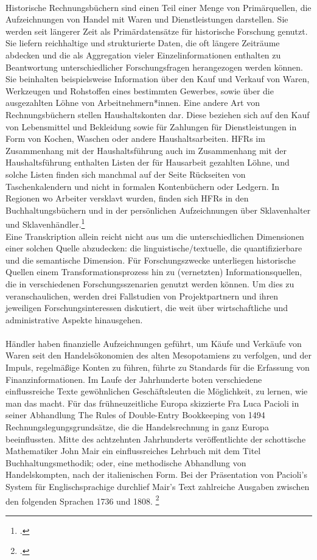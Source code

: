 \documentclass[12pt,a4paper]{article}
\begin{document}
\\
Historische Rechnungsbüchern sind einen Teil einer Menge von Primärquellen, die Aufzeichnungen von Handel mit Waren und Dienstleistungen darstellen. Sie werden seit längerer Zeit als Primärdatensätze für historische Forschung genutzt. Sie liefern reichhaltige und strukturierte Daten, die oft längere Zeiträume abdecken und die als Aggregation vieler Einzelinformationen enthalten zu Beantwortung unterschiedlicher Forschungsfragen herangezogen werden können. Sie beinhalten beispielsweise Information über den Kauf und Verkauf von Waren, Werkzeugen und Rohstoffen eines bestimmten Gewerbes, sowie über die ausgezahlten Löhne von Arbeitnehmern*innen. Eine andere Art von Rechnungsbüchern stellen Haushaltskonten dar. Diese beziehen sich auf den Kauf von Lebensmittel und Bekleidung sowie für Zahlungen für Dienstleistungen in Form von Kochen, Waschen oder andere Haushaltsarbeiten.   HFRs im Zusammenhang mit der Haushaltsführung auch im Zusammenhang mit der Haushaltsführung enthalten Listen der für Hausarbeit gezahlten Löhne, und solche Listen finden sich manchmal auf der Seite Rückseiten von Taschenkalendern und nicht in formalen Kontenbüchern oder Ledgern. In Regionen wo Arbeiter versklavt wurden, finden sich HFRs in den Buchhaltungsbüchern und in der persönlichen Aufzeichnungen über Sklavenhalter und Sklavenhändler.\footcite[][S.2]{tomasek2013encoding}
\\
Eine Transkription allein reicht nicht aus um die unterschiedlichen Dimensionen einer solchen Quelle abzudecken: die linguistische/textuelle, die quantifizierbare und die semantische Dimension. Für Forschungszwecke unterliegen historische Quellen einem Transformationsprozess hin zu (vernetzten) Informationsquellen, die in verschiedenen Forschungsszenarien genutzt werden können. Um dies zu veranschaulichen, werden drei Fallstudien von Projektpartnern und ihren jeweiligen Forschungsinteressen diskutiert, die weit über wirtschaftliche und administrative Aspekte hinausgehen.
\\
\\
Händler haben finanzielle Aufzeichnungen geführt, um Käufe und Verkäufe von Waren seit den Handelsökonomien des alten Mesopotamiens zu verfolgen, und der Impuls, regelmäßige Konten zu führen, führte zu Standards für die Erfassung von Finanzinformationen. Im Laufe der Jahrhunderte boten verschiedene einflussreiche Texte gewöhnlichen Geschäftsleuten die Möglichkeit, zu lernen, wie man das macht. Für das frühneuzeitliche Europa skizzierte Fra Luca Pacioli in seiner Abhandlung The Rules of Double-Entry Bookkeeping von 1494 Rechnungslegungsgrundsätze, die die Handelsrechnung in ganz Europa beeinflussten. Mitte des achtzehnten Jahrhunderts veröffentlichte der schottische Mathematiker John Mair ein einflussreiches Lehrbuch mit dem Titel 
Buchhaltungsmethodik; oder, eine methodische Abhandlung von Handelskompten, nach der italienischen Form. Bei der Präsentation von Pacioli's System für Englischsprachige durchlief Mair's Text zahlreiche Ausgaben zwischen den folgenden Sprachen 1736 und 1808. \footcite[][S.3]{tomasek2013encoding}
\end{document}
